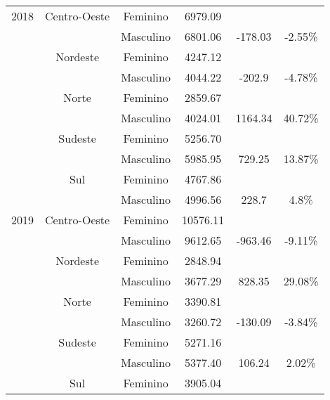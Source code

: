 \begin{table}[htbp]
\begin{center}
\begin{tabular}{|c|c|c|c|c|c|}
			2018         & Centro-Oeste     & Feminino      & 6979.09        &              &                \\
			             &                  & Masculino     & 6801.06        & -178.03      & -2.55\%        \\
			             & Nordeste         & Feminino      & 4247.12        &              &                \\
			             &                  & Masculino     & 4044.22        & -202.9       & -4.78\%        \\
			             & Norte            & Feminino      & 2859.67        &              &                \\
			             &                  & Masculino     & 4024.01        & 1164.34      & 40.72\%        \\
			             & Sudeste          & Feminino      & 5256.70        &              &                \\
			             &                  & Masculino     & 5985.95        & 729.25       & 13.87\%        \\
			             & Sul              & Feminino      & 4767.86        &              &                \\
			             &                  & Masculino     & 4996.56        & 228.7        & 4.8\%          \\ \hline
			2019         & Centro-Oeste     & Feminino      & 10576.11       &              &                \\
			             &                  & Masculino     & 9612.65        & -963.46      & -9.11\%        \\
			             & Nordeste         & Feminino      & 2848.94        &              &                \\
			             &                  & Masculino     & 3677.29        & 828.35       & 29.08\%        \\
			             & Norte            & Feminino      & 3390.81        &              &                \\
			             &                  & Masculino     & 3260.72        & -130.09      & -3.84\%        \\
			             & Sudeste          & Feminino      & 5271.16        &              &                \\
			             &                  & Masculino     & 5377.40        & 106.24       & 2.02\%         \\
			             & Sul              & Feminino      & 3905.04        &              &                \\

\end{tabular}
\end{center}
\end{table}
